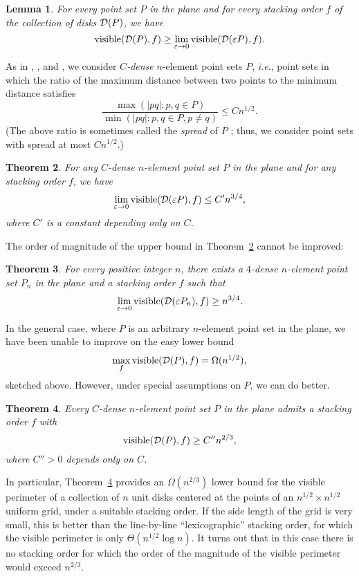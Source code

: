 \documentclass[11pt]{article}
\newtheorem{thm}{Theorem}             \newtheorem{lem}[thm]{Lemma}
\DeclareMathOperator{\vis}{\mathrm{visible}}
\newcommand{\eps}{\varepsilon}
\begin{document}
\begin{lem}\label{lemma1}  For every point set $P$ in the plane and for
  every stacking order $f$ of the collection of disks ${\cal D}(P)$, we have
$$\vis({\cal D}(P),f)\ge\lim_{\eps\rightarrow 0}\vis({\cal D}(\eps P),f).$$
\end{lem}

As in \cite{AlKP89}, \cite{Va92}, and \cite{Va96}, we consider {\em $C$-dense}
$n$-element point sets $P$, {\em i.e}., point sets in which the ratio of the maximum distance between two points to the minimum distance satisfies
$$\frac{\max(|pq| : p,q\in P)}{\min(|pq| : p,q\in P, p\not=q)}\le C n^{1/2}.$$
(The above ratio is sometimes called the \emph{spread} of $P$ \cite{Er03}; thus, we consider point sets with spread at most $Cn^{1/2}$.)

\begin{thm}\label{theorem2} For any $C$-dense $n$-element point set $P$ in the plane and for any stacking order $f$, we have
$$\lim_{\eps\rightarrow 0}\vis({\cal D}(\eps P),f)\le C'n^{3/4},$$
where $C'$ is a constant depending only on $C$.
\end{thm}

The order of magnitude of the upper bound in Theorem~\ref{theorem2} cannot be
improved:

\begin{thm}\label{theorem3} For every positive integer $n$, there exists a $4$-dense $n$-element point set $P_n$ in the plane and a stacking order $f$ such that
$$\lim_{\eps\rightarrow 0}\vis({\cal D}(\eps P_n),f)\ge n^{3/4}.$$
\end{thm}

In the general case, where $P$ is an arbitrary $n$-element point set in the plane, we have been unable to improve on the easy lower bound
$$\max_f \vis({\cal D}(P),f)=\Omega(n^{1/2}),$$
sketched above. However, under special assumptions on $P$, we can do better.

\begin{thm}\label{theorem4} Every $C$-dense $n$-element point set $P$ in the plane admits a stacking order $f$ with
$$ \vis({\cal D}(P),f)\ge C''n^{2/3},$$
where $C''>0$ depends only on $C$.
\end{thm}

In particular, Theorem~\ref{theorem4} provides an $\Omega(n^{2/3})$ lower bound for the
visible perimeter of a collection of $n$ unit disks centered at the points of
an $n^{1/2}\times n^{1/2}$ uniform grid, under
a suitable stacking order. If the side length of the grid is very small, this is
better than the line-by-line ``lexicographic'' stacking order, for which the
visible perimeter is only $\Theta(n^{1/2}\log n)$. It turns out that
in this case there is no stacking order for which the order of the magnitude
of the visible perimeter would exceed $n^{2/3}$.
\end{document}
